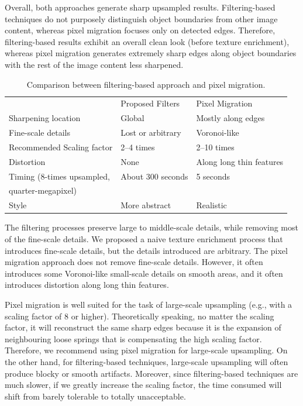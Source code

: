 Overall, both approaches generate sharp upsampled results. Filtering-based techniques do not purposely distinguish object boundaries from other image content, whereas pixel migration focuses only on detected edges. Therefore, filtering-based results exhibit an overall clean look (before texture enrichment), whereas pixel migration generates extremely sharp edges along object boundaries with the rest of the image content less sharpened. 

\begin{table}
\begin{tabular}{ | l | l | l |}
\hline   & Proposed Filters &  Pixel Migration  \\ 
\hhline{|=|=|=|} Sharpening location & Global & Mostly along edges \\ 
\hline Fine-scale details & Lost or arbitrary& Voronoi-like \\ 
\hline Recommended Scaling factor & 2--4 times & 2--10 times \\ 
\hline Distortion & None & Along long thin features \\ 
\hline Timing (8-times upsampled, & About 300 seconds & 5 seconds \\ 
    quarter-megapixel) &  &  \\ 
\hline Style & More abstract & Realistic\\  \hline
\end{tabular} 
\caption{Comparison between filtering-based approach and pixel migration.}
\label{table:2}
\end{table}

The filtering processes preserve large to middle-scale details, while removing most of the fine-scale details. We proposed a naive texture enrichment process that introduces fine-scale details, but the details introduced are arbitrary. The pixel migration approach does not remove fine-scale details. However, it often introduces some Voronoi-like small-scale details on smooth areas, and it often introduces distortion along long thin features.

Pixel migration is well suited for the task of large-scale upsampling (e.g., with a scaling factor of 8 or higher). Theoretically speaking, no matter the scaling factor, it will reconstruct the same sharp edges because it is the expansion of neighbouring loose springs that is compensating the high scaling factor. Therefore, we recommend using pixel migration for large-scale upsampling. On the other hand, for filtering-based techniques, large-scale upsampling will often produce blocky or smooth artifacts. Moreover, since filtering-based techniques are much slower, if we greatly increase the scaling factor, the time consumed will shift from barely tolerable to totally unacceptable. 

